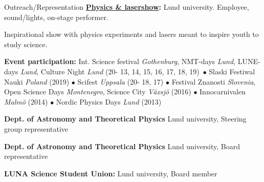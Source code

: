 \begin{rubric}{Outreach/Representation}
\entry*[2013 - current]%
\textbf{\href{https://www.facebook.com/Physicsandlasershow}{Physics \& lasershow}:} Lund university. Employee, sound/lights, on-stage performer. \par Inspirational show with physics experiments and lasers meant to inspire youth to study science. \par
\textbf{Event participation:} Int. Science festival \textit{Gothenburg}, NMT-days \textit{Lund}, LUNE-days \textit{Lund}, Culture Night \textit{Lund} (20- 13, 14, 15, 16, 17, 18, 19)\ $\bullet$ Slaski Festiwal Nauki \textit{Poland} (2019)  $\bullet$ Scifest \textit{Uppsala} (20- 18, 17) $\bullet$ Festival Znanosti \textit{Slovenia}, Open Science Days \textit{Montenegro}, Science City \textit{Växsjö} (2016) $\bullet$ Innocarnivalen \textit{Malmö} (2014) $\bullet$ Nordic Physics Days \textit{Lund} (2013)

\entry*[2020-current]%
\textbf{Dept. of Astronomy and Theoretical Physics} Lund university, Steering group representative \par

\entry*[2017-2018]%
\textbf{Dept. of Astronomy and Theoretical Physics} Lund university, Board representative \par

\entry*[2013-2015]%
\textbf{LUNA Science Student Union:} Lund university, Board member \par

\end{rubric}